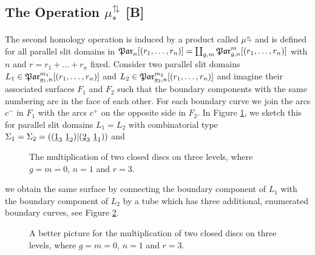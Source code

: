 \subsection{The Operation \texorpdfstring{$\mu^{\updownarrows}_\ast$}{muupdownarrows*} [B]}
\label{homology_operations:parallel_patching_slit_pics:construction_of_mu_updownarrows}
The second homology operation is induced by a product called $\mu^{\updownarrows}$
and is defined for all parallel slit domains in $\Par_n[(r_1, \ldots, r_n)] = \coprod_{g,m} \Par_{g,n}^m[(r_1, \ldots, r_n)]$ with $n$ and $r=r_1 + \ldots + r_n$ fixed.
Consider two parallel slit domains $L_1 \in \Par_{g_1,n}^{m_1}[(r_1, \ldots, r_n)]$ and $L_2 \in \Par_{g_2,n}^{m_2}[(r_1, \ldots, r_n)]$
and imagine their associated surfaces $F_1$ and $F_2$ such that the boundary components with the same numbering are in the face of each other.
For each boundary curve we join the arcs $c^-$ in $F_1$ with the arcs $c^+$ on the opposite side in $F_2$.
In Figure \ref{homology_operations:parallel_patching_slit_pics:parallel_mutliplication_three_slit_pictures}, we sketch this for parallel slit domains $L_1 = L_2$
with combinatorial type $\Sigma_1 = \Sigma_2 = ((\underline{\smash{1}}_3\ \underline{\smash{1}}_2) | (\underline{\smash{2}}_3\ \underline{\smash{1}}_1))$ and
\begin{figure}[ht]
    \centering
    
    \def\svgwidth{.5\columnwidth}
    \raisebox{-0.5\height}{}
    \hspace{10pt}
    \def\svgwidth{.3\columnwidth}
    \raisebox{-0.5\height}{}
    \caption{
        \label{homology_operations:parallel_patching_slit_pics:parallel_mutliplication_three_slit_pictures}
        The multiplication of two closed discs on three levels, where $g=m=0$, $n=1$ and $r=3$.}
\end{figure}
we obtain the same surface by connecting the boundary component of $L_1$ with the boundary component of $L_2$ by a tube which has three additional, enumerated boundary curves,
see Figure \ref{homology_operations:parallel_patching_slit_pics:parallel_mutliplication_glueing_with_handle}.
\begin{figure}[ht]
    \centering
    \def\svgwidth{.5\columnwidth}
    
    \caption{
        \label{homology_operations:parallel_patching_slit_pics:parallel_mutliplication_glueing_with_handle}
        A better picture for the multiplication of two closed discs on three levels, where $g=m=0$, $n=1$ and $r=3$.}
\end{figure}
